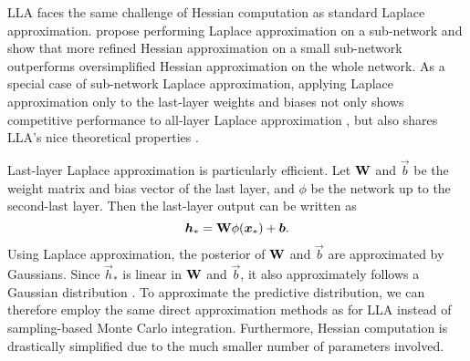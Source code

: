 LLA faces the same challenge of Hessian computation as standard Laplace approximation. \cite{daxbergerSubnetLA2021} propose performing Laplace approximation on a sub-network and show that more refined Hessian approximation on a small sub-network outperforms oversimplified Hessian approximation on the whole network. As a special case of sub-network Laplace approximation, applying Laplace approximation only to the last-layer weights and biases not only shows competitive performance to all-layer Laplace approximation \citep{daxbergerLaplaceRedux2021}, but also shares LLA's nice theoretical properties \citep{kristiadiABitBayesian2020}.

Last-layer Laplace approximation is particularly efficient. Let $\bm{\mathbf{W}}$ and $\vec{b}$ be the weight matrix and bias vector of the last layer, and $\phi$ be the network up to the second-last layer. Then the last-layer output can be written as
\begin{equation*}
  \bm{h}_* = \bm{\mathbf{W}} \phi(\bm{x}_*) + \bm{b}.
\end{equation*}
Using Laplace approximation, the posterior of $\bm{\mathbf{W}}$ and $\vec{b}$ are approximated by Gaussians. Since $\vec{h}_*$ is linear in $\bm{\mathbf{W}}$ and $\vec{b}$, it also approximately follows a Gaussian distribution \citep{eschenhagenMixturesLaplace2021}. To approximate the predictive distribution, we can therefore employ the same direct approximation methods as for LLA instead of sampling-based Monte Carlo integration. Furthermore, Hessian computation is drastically simplified due to the much smaller number of parameters involved.

